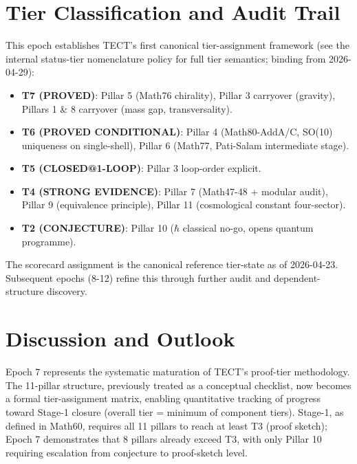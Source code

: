 \section{Tier Classification and Audit Trail}
This epoch establishes TECT's first canonical tier-assignment framework (see
the internal status-tier nomenclature policy for full tier semantics; binding from 2026-04-29):

\begin{itemize}
\item \textbf{T7 (PROVED)}: Pillar 5 (Math76 chirality), Pillar 3 carryover (gravity),
  Pillars 1 \& 8 carryover (mass gap, transversality).
\item \textbf{T6 (PROVED CONDITIONAL)}: Pillar 4 (Math80-AddA/C, SO(10) uniqueness on
  single-shell), Pillar 6 (Math77, Pati-Salam intermediate stage).
\item \textbf{T5 (CLOSED@1-LOOP)}: Pillar 3 loop-order explicit.
\item \textbf{T4 (STRONG EVIDENCE)}: Pillar 7 (Math47-48 + modular audit), Pillar 9 (equivalence principle),
  Pillar 11 (cosmological constant four-sector).
\item \textbf{T2 (CONJECTURE)}: Pillar 10 ($\hbar$ classical no-go, opens quantum programme).
\end{itemize}

The scorecard assignment is the canonical reference tier-state as of
2026-04-23. Subsequent epochs (8-12) refine this through further audit and
dependent-structure discovery.

\section{Discussion and Outlook}
Epoch 7 represents the systematic maturation of TECT's proof-tier methodology.
The 11-pillar structure, previously treated as a conceptual checklist, now
becomes a formal tier-assignment matrix, enabling quantitative tracking of
progress toward Stage-1 closure (overall tier = minimum of component tiers).
Stage-1, as defined in Math60, requires all 11 pillars to reach at least T3
(proof sketch); Epoch 7 demonstrates that 8 pillars already exceed T3, with
only Pillar 10 requiring escalation from conjecture to proof-sketch level.

